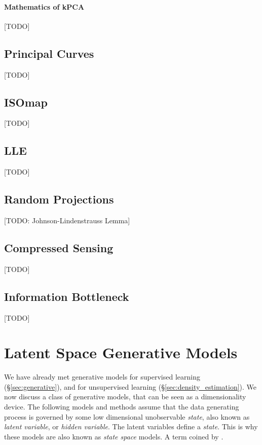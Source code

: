 \paragraph{Mathematics of kPCA}
[TODO]



\subsection{Principal Curves}
[TODO]


\subsection{ISOmap}
[TODO]


\subsection{LLE}
[TODO]



\subsection{Random Projections}
[TODO: Johnson-Lindenstrauss Lemma]



\subsection{Compressed Sensing}
\label{sec:compressed_sensing}
[TODO]



\subsection{Information Bottleneck}
[TODO]


\begin{remark}
\end{remark}








\section{Latent Space Generative Models}
\label{sec:latent_space}

We have already met generative models for supervised learning (\S\ref{sec:generative}), and for unsupervised learning (\S\ref{sec:density_estimation}).
We now discuss a class of generative models, that can be seen as a dimensionality device. 
The following models and methods assume that the data generating process is governed by some low dimensional unobservable \emph{state}, also known as \emph{latent variable}, or \emph{hidden variable}.
The latent variables define a \emph{state}. This is why these models are also known as \emph{state space} models. A term coined by \citet{kalman_contributions_1960}.

